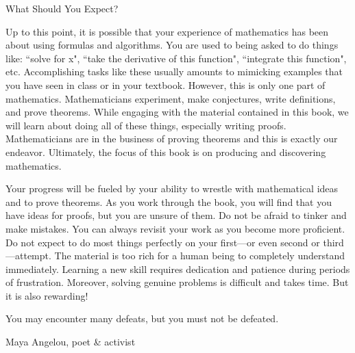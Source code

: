 \begin{section}{What Should You Expect?}\label{sec:what should you expect}

Up to this point, it is possible that your experience of mathematics has been about using formulas and algorithms. You are used to being asked to do things like: ``solve for x", ``take the derivative of this function", ``integrate this function", etc. Accomplishing tasks like these usually amounts to mimicking examples that you have seen in class or in your textbook. However, this is only one part of mathematics.  Mathematicians experiment, make conjectures, write definitions, and prove theorems.  While engaging with the material contained in this book, we will learn about doing all of these things, especially writing proofs. Mathematicians are in the business of proving theorems and this is exactly our endeavor. Ultimately, the focus of this book is on producing and discovering mathematics.

Your progress will be fueled by your ability to wrestle with mathematical ideas and to prove theorems.  As you work through the book, you will find that you have ideas for proofs, but you are unsure of them.  Do not be afraid to tinker and make mistakes.  You can always revisit your work as you become more proficient. Do not expect to do most things perfectly on your first---or even second or third---attempt. The material is too rich for a human being to completely understand immediately. Learning a new skill requires dedication and patience during periods of frustration. Moreover, solving genuine problems is difficult and takes time. But it is also rewarding! 

\epigraph{You may encounter many defeats, but you must not be defeated.}{Maya Angelou, poet \& activist}
	
\end{section}

